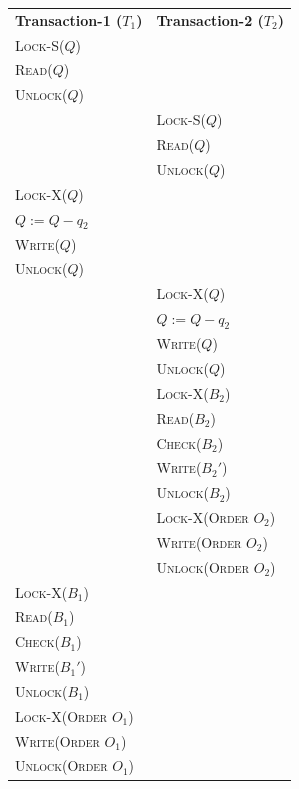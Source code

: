 \documentclass[12pt]{report}
\begin{document}
    \begin{center}
        \begin{adjustbox}{width=\textwidth}
            \begin{tabularx}{\textwidth}{|X|X|}
            \hline
            \multirow{2}{*}{\textbf{Transaction-1 ($T_{1}$)}} & \multirow{2}{*}{\textbf{Transaction-2 ($T_{2}$)}} \\
            & \\ \hline
            \textsc{Lock-S($Q$)} & \\
            \textsc{Read($Q$)} & \\
            \textsc{Unlock($Q$)} & \\
            & \textsc{Lock-S($Q$)} \\
            & \textsc{Read($Q$)} \\
            & \textsc{Unlock($Q$)} \\
            \textsc{Lock-X($Q$)} & \\
            \textsc{$Q := Q - q_{2}$} & \\
            \textsc{Write($Q$)} & \\
            \textsc{Unlock($Q$)} & \\
            & \textsc{Lock-X($Q$)} \\
            & \textsc{$Q := Q - q_{2}$} \\
            & \textsc{Write($Q$)} \\
            & \textsc{Unlock($Q$)} \\
            & \textsc{Lock-X($B_{2}$)} \\
            & \textsc{Read($B_{2}$)} \\
            & \textsc{Check($B_{2}$)} \\
            & \textsc{Write($B_{2}'$)} \\
            & \textsc{Unlock($B_{2}$)} \\
            & \textsc{Lock-X(Order $O_{2}$)} \\
            & \textsc{Write(Order $O_{2}$)} \\
            & \textsc{Unlock(Order $O_{2}$)} \\
            \textsc{Lock-X($B_{1}$)} & \\
            \textsc{Read($B_{1}$)} & \\
            \textsc{Check($B_{1}$)} & \\
            \textsc{Write($B_{1}'$)} & \\
            \textsc{Unlock($B_{1}$)} & \\
            \textsc{Lock-X(Order $O_{1}$)} & \\
            \textsc{Write(Order $O_{1}$)} & \\
            \textsc{Unlock(Order $O_{1}$)} & \\
            \hline
            \end{tabularx}
        \end{adjustbox}
    \end{center}
\end{document}
